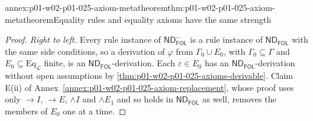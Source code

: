 \begin{annexitem}{annex:p01-w02-p01-025-axiom-metatheorem}{thm:p01-w02-p01-025-axiom-metatheorem}{Equality rules and equality axioms have the same strength}
\begin{proof}
\emph{Right to left.}  Every rule instance of
\(\mathsf{ND}^{-}_{\mathsf{FOL}}\) is a rule instance of
\(\mathsf{ND}_{\mathsf{FOL}}\) with the same side conditions, so a derivation
of \(\varphi\) from \(\Gamma_0\cup E_0\), with \(\Gamma_0\subseteq\Gamma\) and
\(E_0\subseteq\mathrm{Eq}_{\mathcal L}\) finite, is an
\(\mathsf{ND}_{\mathsf{FOL}}\)-derivation.  Each \(\varepsilon\in E_0\) has
an \(\mathsf{ND}_{\mathsf{FOL}}\)-derivation without open assumptions by
\cref{thm:p01-w02-p01-025-axioms-derivable}.  Claim E(ii) of
Annex~\ref{annex:p01-w02-p01-025-axiom-replacement}, whose proof uses only
\(\to I\), \(\to E\), \(\land I\) and \(\land E_1\) and so holds in
\(\mathsf{ND}_{\mathsf{FOL}}\) as well, removes the members of \(E_0\) one at a
time.


\end{proof}
\end{annexitem}
